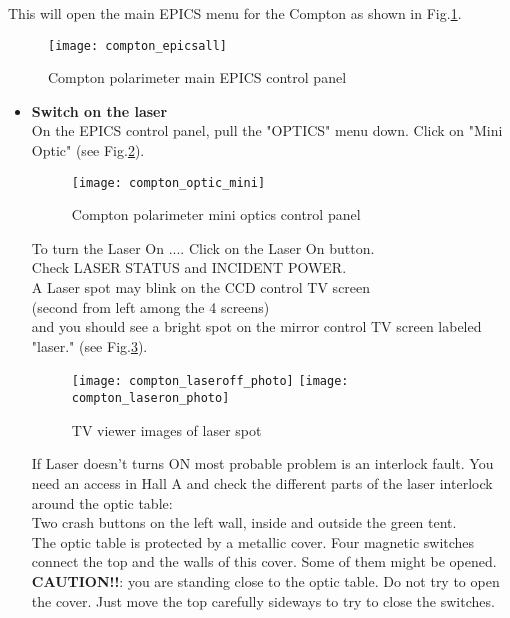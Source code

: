 {{This will open the main EPICS menu for the Compton as shown in Fig.\ref{fig:compton_epicsall}.
 \begin{figure}[htp]
    \begin{center}
        \texttt{[image: compton\_epicsall]}
    \end{center}
    \caption[compton:epics main control]{Compton polarimeter main EPICS control panel }
    \label{fig:compton_epicsall}
 \end{figure}


\begin{itemize}
\item {\bf Switch on the laser}\\

On the EPICS control panel, pull the "OPTICS" menu down. Click on "Mini Optic" 
(see Fig.\ref{fig:compton_optic_mini}).
\begin{figure}[htp]
    \begin{center}
        \texttt{[image: compton\_optic\_mini]}
     \end{center}
    \caption[compton:epics mini control]{Compton polarimeter mini optics control panel }
    \label{fig:compton_optic_mini}
 \end{figure}


To turn the Laser On .... Click on the Laser On button.\\
        Check LASER STATUS and INCIDENT POWER.\\
        A Laser spot may blink on the CCD control TV screen\\ 
	(second from left among the 4 screens)\\
        and you should see a bright spot on the mirror control TV screen labeled "laser." 
	(see Fig.\ref{fig:compton_laser_photo}).
 \begin{figure}[htp]
    \begin{center}
        \texttt{[image: compton\_laseroff\_photo]}
        \texttt{[image: compton\_laseron\_photo]}
    \end{center}
    \caption[compton:laser spot]{TV viewer images of laser spot }
    \label{fig:compton_laser_photo}
 \end{figure}

        If Laser doesn't turns ON most probable problem is an interlock
        fault.
        You need an access in Hall A and check the different parts of the
        laser interlock around the optic table:\\
        Two crash buttons on the left wall, inside and outside the green
        tent.\\
        The optic table is protected by a metallic cover. Four magnetic switches connect the top and the walls
        of this cover. Some of them might be opened. {\bf CAUTION!!}: you are standing close to the optic table.
        Do not try to open the cover. Just move the top carefully sideways to try to close the switches.
	

\end{itemize}}}
